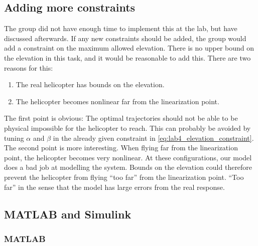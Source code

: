 \documentclass[../main.tex]{subfiles}
\begin{document}
\subsection{Adding more constraints}
The group did not have enough time to implement this at the lab, but have discussed afterwards. If any new constraints should be added, the group would add a constraint on the maximum allowed elevation. There is no upper bound on the elevation in this task, and it would be reasonable to add this. There are two reasons for this: 
\begin{enumerate}
	\item The real helicopter has bounds on the elevation.
	\item The helicopter becomes nonlinear far from the linearization point.
\end{enumerate}
The first point is obvious: The optimal trajectories should not be able to be physical impossible for the helicopter to reach. This can probably be avoided by tuning $ \alpha  $ and $ \beta $ in the already given constraint in \cref{eq:lab4_elevation_constraint}. The second point is more interesting. When flying far from the linearization point, the helicopter becomes very nonlinear. At these configurations, our model does a bad job at modelling the system. Bounds on the elevation could therefore prevent the helicopter from flying ``too far'' from the linearization point. ``Too far'' in the sense that the model has large errors from the real response.


\subsection{MATLAB and Simulink}
\subsubsection{MATLAB}

\end{document}
